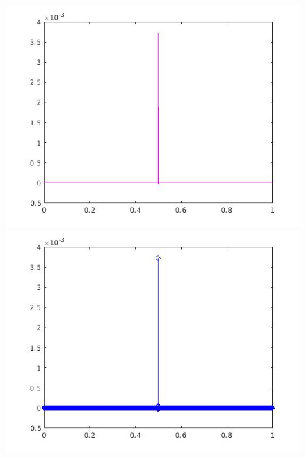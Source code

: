 \documentclass[a4paper,11pt]{article}
\begin{document}
\begin{figure}[!hp]
\centering
\begin{minipage}{.5\textwidth}
  \centering
  \includegraphics[width=1\linewidth]{images/lab2_71.jpg}
\end{minipage}%
\begin{minipage}{.5\textwidth}
  \centering
  \includegraphics[width=1\linewidth]{images/lab2_72.jpg}
\end{minipage}
\end{figure}
\end{document}
